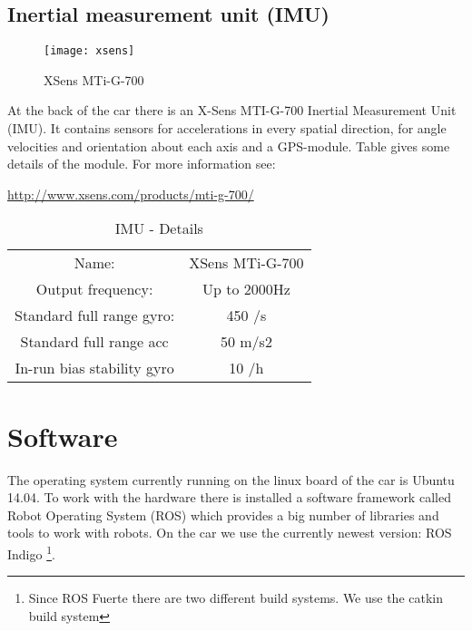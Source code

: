 \newpage
\subsection{Inertial measurement unit (IMU)}
\label{sec:overview_imu}

\begin{figure}[h]
	\centering
		\texttt{[image: xsens]}
	\caption{XSens MTi-G-700}
	\label{fig:xsens}
\end{figure}

At the back of the car there is an X-Sens MTI-G-700 Inertial Measurement Unit (IMU). It contains sensors for accelerations in every spatial direction, for angle velocities and orientation about each axis and a GPS-module. Table  gives some details of the module. For more information see: 

\hyperref[http://www.xsens.com/products/mti-g-700/]{http://www.xsens.com/products/mti-g-700/}

\begin{table}[h]
	\centering	
	\begin{tabular}{cc} %
		\hline 
		Name: & XSens MTi-G-700 \\
		Output frequency: & Up to 2000Hz \\
		Standard full range gyro: & 450 \textdegree/s \\
		Standard full range acc		& 50 m/s2 \\
		In-run bias stability gyro& 10 \textdegree/h \\
		\hline
	\end{tabular}
	\caption{IMU - Details} %
	\label{tab:imu_details}
\end{table}




\section{Software}
\label{sec:overview_software}

The operating system currently running on the linux board of the car is Ubuntu 14.04. To work with the hardware there is installed a software framework called Robot Operating System (ROS) which provides a big number of libraries and tools to work with robots. On the car we use the currently newest version: ROS Indigo \footnote{Since ROS Fuerte there are two different build systems. We use the catkin build system}. 

